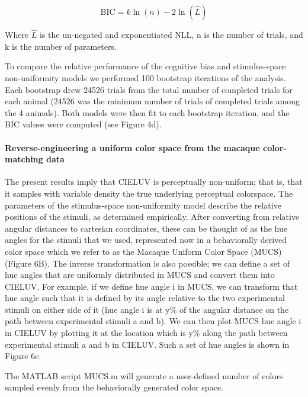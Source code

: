 \begin{equation}
    \text{BIC} = k\ln(n)-2\ln(\hat{L})
\end{equation}

Where $\hat{L}$ is the un-negated and exponentiated NLL, n is the number of trials, and k is the number of parameters.

To compare the relative performance of the cognitive bias and stimulus-space non-uniformity models we performed 100 bootstrap iterations of the analysis. 
Each bootstrap drew 24526 trials from the total number of completed trials for each animal (24526 was the minimum number of trials of completed trials among the 4 animals). 
Both models were then fit to each bootstrap iteration, and the BIC values were computed (see Figure 4d).  %

\paragraph{Reverse-engineering a uniform color space from the macaque color-matching data}

The present results imply that CIELUV is perceptually non-uniform; that is, that it samples with variable density the true underlying perceptual colorspace. 
The parameters of the stimulus-space non-uniformity model describe the relative positions of the stimuli, as determined empirically. 
After converting from relative angular distances to cartesian coordinates, these can be thought of as the hue angles for the stimuli that we used, represented now in a behaviorally derived color space which we refer to as the Macaque Uniform Color Space (MUCS) (Figure 6B). 
The inverse transformation is also possible; we can define a set of hue angles that are uniformly distributed in MUCS and convert them into CIELUV. 
For example, if we define hue angle i in MUCS, we can transform that hue angle such that it is defined by its angle relative to the two experimental stimuli on either side of it (hue angle i is at y\% of the angular distance on the path between experimental stimuli a and b). 
We can then plot MUCS hue angle i in CIELUV by plotting it at the location which is y\% along the path between experimental stimuli a and b in CIELUV. Such a set of hue angles is shown in Figure 6c. 

The MATLAB script MUCS.m will generate a user-defined number of colors sampled evenly from the behaviorally generated color space. 















